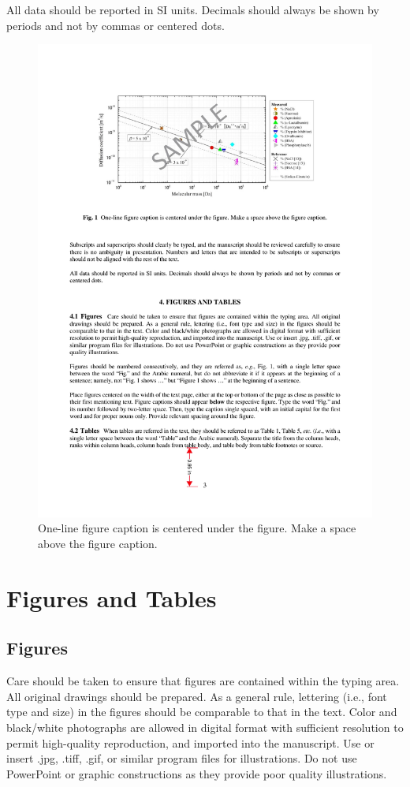 \documentclass[upint,varvw]{prtec}
\begin{document}
All data should be reported in SI units. Decimals should always be shown by periods and not by commas or centered dots.


\begin{figure}[tb]
\centering\includegraphics[width=\linewidth]{sample-figure.pdf}
\caption{\label{fig:1} One-line figure caption is centered under the figure. Make a space above the figure caption.}
\end{figure}


\section{Figures and Tables}

\subsection{Figures}  Care should be taken to ensure that figures are contained within the typing area. All original drawings should be prepared. As a general rule, lettering (i.e., font type and size) in the figures should be comparable to that in the text. Color and black/white photographs are allowed in digital format with sufficient resolution to permit high-quality reproduction, and imported into the manuscript. Use or insert .jpg, .tiff, .gif, or similar program files for illustrations. Do not use PowerPoint or graphic constructions as they provide poor quality illustrations.
\end{document}
